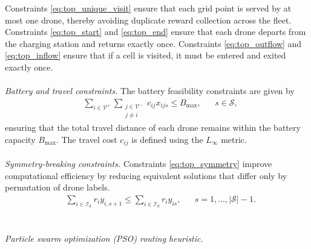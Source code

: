 \documentclass[pdflatex,sn-mathphys-num]{sn-jnl}%
\theoremstyle{thmstyleone}%
\theoremstyle{thmstyletwo}%
\theoremstyle{thmstylethree}%
\begin{document}
Constraints \eqref{eq:top_unique_visit} ensure that each grid point is served by at most one drone, thereby avoiding duplicate reward collection across the fleet. Constraints \eqref{eq:top_start} and \eqref{eq:top_end} ensure that each drone departs from the charging station and returns exactly once. Constraints \eqref{eq:top_outflow} and \eqref{eq:top_inflow} ensure that if a cell is visited, it must be entered and exited exactly once.\\
\\
\noindent \textit{Battery and travel constraints.}
The battery feasibility constraints are given by
\begin{align}
& \sum_{i \in \mathcal{V}^{+}}
\sum_{\substack{j \in \mathcal{V}^{-}\\ j \neq i}}
c_{ij}x_{ijs}
\le B_{\text{max}},
&& s \in \mathcal{S},
\label{eq:top_battery}
\end{align}
\noindent ensuring that the total travel distance of each drone remains within the battery capacity $B_{\text{max}}$. The travel cost $c_{ij}$ is defined using the $L_{\infty}$ metric.
\\
\\
\textit{Symmetry-breaking constraints.} Constraints \eqref{eq:top_symmetry} improve computational efficiency by reducing equivalent solutions that differ only by permutation of drone labels.
\begin{align}
    & \sum_{i \in \mathcal{I}_{\mathrm{d}}} r_i y_{i,s+1}
\le
\sum_{i \in \mathcal{I}_{\mathrm{d}}} r_i y_{is},
&& s=1,\dots,|\mathcal{S}|-1.
\label{eq:top_symmetry}
\end{align}
\\
\\
\noindent \textit{Particle swarm optimization (PSO) routing heuristic.}
\end{document}
